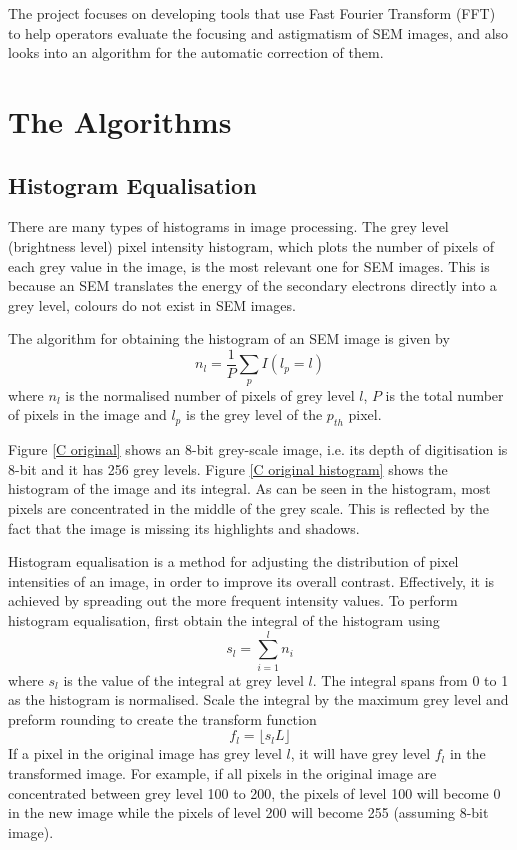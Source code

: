 \documentclass{article}
\begin{document}
The project focuses on developing tools that use Fast Fourier Transform (FFT) to help operators evaluate the focusing and astigmatism of SEM images, and also looks into an algorithm for the automatic correction of them.

\section{The Algorithms}
\subsection{Histogram Equalisation}
There are many types of histograms in image processing. The grey level (brightness level) pixel intensity histogram, which plots the number of pixels of each grey value in the image, is the most relevant one for SEM images. This is because an SEM translates the energy of the secondary electrons directly into a grey level, colours do not exist in SEM images.

The algorithm for obtaining the histogram of an SEM image is given by
\begin{equation}
    n_l = \frac{1}{P} \sum_{p} I(l_p=l)
\end{equation}
where $n_l$ is the normalised number of pixels of grey level $l$, $P$ is the total number of pixels in the image and $l_p$ is the grey level of the $p_{th}$ pixel. 

Figure \ref{C original} shows an 8-bit grey-scale image, i.e. its depth of digitisation is 8-bit and it has 256 grey levels. Figure \ref{C original histogram} shows the histogram of the image and its integral. As can be seen in the histogram, most pixels are concentrated in the middle of the grey scale. This is reflected by the fact that the image is missing its highlights and shadows.

Histogram equalisation is a method for adjusting the distribution of pixel intensities of an image, in order to improve its overall contrast. Effectively, it is achieved by spreading out the more frequent intensity values. To perform histogram equalisation, first obtain the integral of the histogram using
\[s_l = \sum_{i=1}^{l} n_i\]
where $s_l$ is the value of the integral at grey level $l$. The integral spans from 0 to 1 as the histogram is normalised. Scale the integral by the maximum grey level and preform rounding to create the transform function
\begin{equation}
    f_l = \lfloor s_lL \rfloor
\end{equation}
If a pixel in the original image has grey level $l$, it will have grey level $f_l$ in the transformed image. For example, if all pixels in the original image are concentrated between grey level 100 to 200, the pixels of level 100 will become 0 in the new image while the pixels of level 200 will become 255 (assuming 8-bit image).
\end{document}
